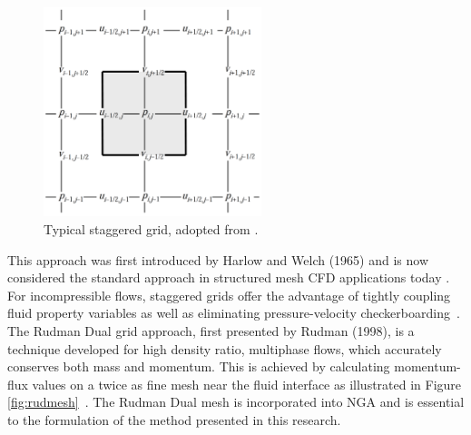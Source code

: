  \begin{figure}[h!]
 	\centering
 	\includegraphics[width=2.5in]{figs/StaggeredGrid}
 	\caption{Typical staggered grid, adopted from \cite{TRYG}.}
 	\label{fig:StagGrid}
 \end{figure}

\noindent This approach was first introduced by Harlow and Welch (1965) and is now considered the standard approach in structured mesh CFD applications today \cite{HARLOW1965}. For incompressible flows, staggered grids offer the advantage of tightly coupling fluid property variables as well as eliminating pressure-velocity checkerboarding~\cite{rudman}. The Rudman Dual grid approach, first presented by Rudman (1998), is a technique developed for high density ratio, multiphase flows, which accurately conserves both mass and momentum. This is achieved by calculating momentum-flux values on a twice as fine mesh near the fluid interface as illustrated in Figure \ref{fig:rudmesh}~\cite{Rudman}. The Rudman Dual mesh is incorporated into NGA and is essential to the formulation of the method presented in this research.

